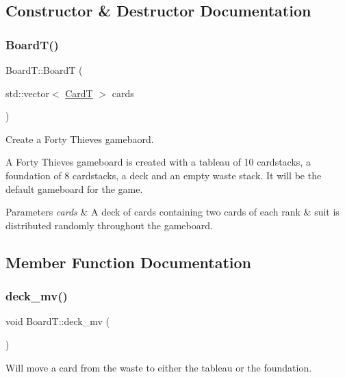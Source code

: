 \subsection{Constructor \& Destructor Documentation}
\mbox{\label{class_board_t_a140c2de28c7308b08c0d736d671fc299}} 
\subsubsection{\texorpdfstring{Board\+T()}{BoardT()}}
{\footnotesize\ttfamily Board\+T\+::\+BoardT (\begin{DoxyParamCaption}\item[{std\+::vector$<$ \hyperlink{struct_card_t}{CardT} $>$}]{cards }\end{DoxyParamCaption})}



Create a Forty Thieves gamebaord. 

A Forty Thieves gameboard is created with a tableau of 10 cardstacks, a foundation of 8 cardstacks, a deck and an empty waste stack. It will be the default gameboard for the game. 
\begin{DoxyParams}{Parameters}
{\em cards} & A deck of cards containing two cards of each rank \& suit is distributed randomly throughout the gameboard. \\
\hline
\end{DoxyParams}


\subsection{Member Function Documentation}
\mbox{\label{class_board_t_a548e3e518666a6f38b49e072a88a6d2c}} 
\subsubsection{\texorpdfstring{deck\+\_\+mv()}{deck\_mv()}}
{\footnotesize\ttfamily void Board\+T\+::deck\+\_\+mv (\begin{DoxyParamCaption}{ }\end{DoxyParamCaption})}



Will move a card from the waste to either the tableau or the foundation. 

